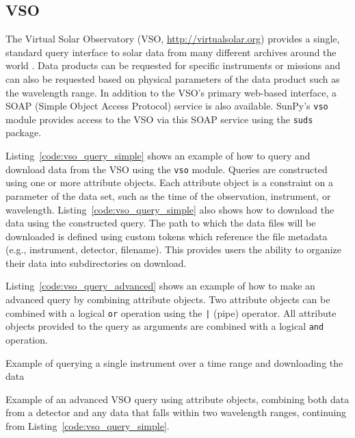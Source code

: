 \subsection{VSO}\label{ssec:vso}

The Virtual Solar Observatory (VSO, \url{http://virtualsolar.org}) provides a 
single, standard query interface to solar data from many different archives 
around the world \citep{hill2009}.
Data products can be requested for specific instruments or missions and
can also be requested based on physical parameters of the data product such
as the wavelength range.
In addition to the VSO's primary web-based interface, a SOAP (Simple Object 
Access Protocol) service is also available.
SunPy's \texttt{vso} module provides access to the VSO via this SOAP service using the
\texttt{suds} package.

Listing~\ref{code:vso_query_simple} shows an example of how to query and download data
from the VSO using the \texttt{vso} module.
Queries are constructed using one or more attribute objects. Each
attribute object is a constraint on a parameter of the data set, such as the
time of the observation, instrument, or wavelength.
Listing~\ref{code:vso_query_simple} also shows how to download the data using
the constructed query. The path to which the data files will be downloaded is defined using custom tokens
which reference the file metadata (e.g., instrument, detector, filename). This provides
users the ability to organize their data into subdirectories on download.

Listing~\ref{code:vso_query_advanced} shows an example of how to make an advanced
query by combining attribute objects.
Two attribute objects can be combined with a logical \texttt{or} operation
using the \texttt{|} (pipe) operator.
All attribute objects provided to the query as arguments are combined with a 
logical \texttt{and} operation.

\begin{listing}[H]
\caption{Example of querying a single instrument over a time range and downloading the data}
\label{code:vso_query_simple}
\end{listing}

\begin{listing}[H]
\caption{Example of an advanced VSO query using attribute objects,
combining both data from a detector and any data that falls within two wavelength ranges,
continuing from Listing~\ref{code:vso_query_simple}.}
\label{code:vso_query_advanced}
\end{listing}
